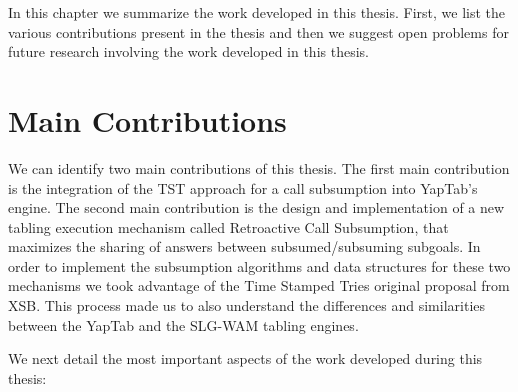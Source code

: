 
In this chapter we summarize the work developed in this thesis. First, we list the various contributions
present in the thesis and then we suggest open problems for future research involving the work
developed in this thesis.

\section{Main Contributions}

We can identify two main contributions of this thesis. The first main contribution is the integration of
the TST approach for a call subsumption into YapTab's engine. The second main contribution is the design and implementation
of a new tabling execution mechanism called Retroactive Call Subsumption, that maximizes the sharing of answers
between subsumed/subsuming subgoals. In order to implement the subsumption algorithms and data structures for
these two mechanisms we took advantage of the Time Stamped Tries original proposal from XSB.
This process made us to also understand the differences and similarities between the YapTab and the SLG-WAM tabling engines.

We next detail the most important aspects of the work developed during this thesis:


